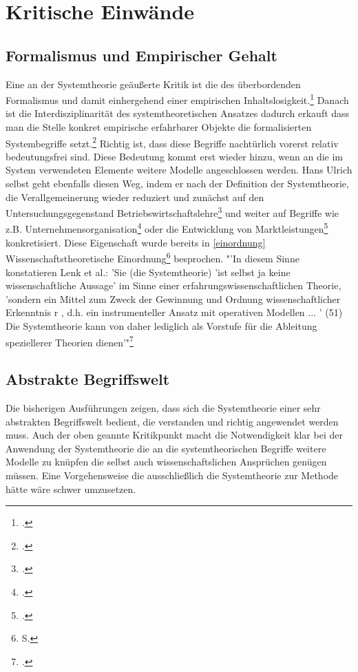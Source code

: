 \documentclass[a4paper,12pt]{article}
\begin{document}
\section{Kritische Einwände}
\subsection{Formalismus und Empirischer Gehalt}
Eine an der Systemtheorie geäußerte Kritik ist die des überbordenden Formalismus und damit einhergehend einer empirischen Inhaltslosigkeit.\footcite[S. 155]{Diesner2015} Danach ist die Interdisziplinarität des systemtheoretischen Ansatzes dadurch erkauft dass man die Stelle konkret empirische erfahrbarer Objekte die formalisierten Systembegriffe setzt.\footcite[S. 23]{Oelsnitz1994} Richtig ist, dass diese Begriffe nachtürlich vorerst relativ bedeutungsfrei sind. Diese Bedeutung kommt erst wieder hinzu, wenn an die im System verwendeten Elemente weitere Modelle angeschlossen werden. Hans Ulrich selbst geht ebenfalls diesen Weg, indem er nach der Definition der Systemtheorie, die Verallgemeinerung wieder reduziert und zunächst auf den Untersuchungsgegenstand Betriebswirtschaftslehre\footcite[S. 135]{Ulrich1968} und weiter auf Begriffe wie z.B. Unternehmensorganisation\footcite[212]{Ulrich1968} oder die Entwicklung von Marktleistungen\footcite[299]{Ulrich2016} konkretisiert. Diese Eigenschaft wurde bereits in \ref{einordnung} Wissenschaftstheoretische Einordnung\footnote{S. \pageref{einordnung}} besprochen. "'In diesem Sinne konstatieren Lenk et al.: 'Sie (die Systemtheorie) 'ist selbst ja keine wissenschaftliche Aussage' im Sinne einer erfahrungswissenschaftlichen Theorie, 'sondern ein Mittel zum Zweck der Gewinnung und Ordnung wissenschaftlicher Erkenntnis r , d.h. ein instrumenteller Ansatz mit operativen Modellen ... ' (51) Die Systemtheorie kann von daher lediglich als Vorstufe für die Ableitung speziellerer Theorien dienen'"\footcite[S. 24]{Oelsnitz1994}
\subsection{Abstrakte Begriffswelt}
Die bisherigen Ausführungen zeigen, dass sich die Systemtheorie einer sehr abstrakten Begriffswelt bedient, die verstanden und richtig angewendet werden muss. Auch der oben geannte Kritikpunkt macht die Notwendigkeit klar bei der Anwendung der Systemtheorie die an die systemtheorischen Begriffe weitere Modelle zu knüpfen die selbst auch wissenschaftslichen Ansprüchen genügen müssen. Eine Vorgehensweise die ausschließlich die Systemtheorie zur Methode hätte wäre schwer umzusetzen.
\end{document}
